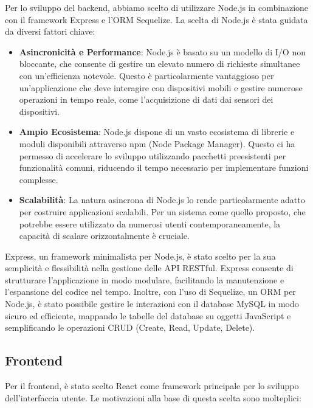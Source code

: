 \documentclass[twoside]{supsistudent}
\begin{document}
Per lo sviluppo del backend, abbiamo scelto di utilizzare Node.js in combinazione con il framework Express e l'ORM Sequelize. La scelta di Node.js è stata guidata da diversi fattori chiave:

\begin{itemize}
  \item \textbf{Asincronicità e Performance}: Node.js è basato su un modello di I/O non bloccante, che consente di gestire un elevato numero di richieste simultanee con un'efficienza notevole. Questo è particolarmente vantaggioso per un'applicazione che deve interagire con dispositivi mobili e gestire numerose operazioni in tempo reale, come l'acquisizione di dati dai sensori dei dispositivi.
  \item \textbf{Ampio Ecosistema}: Node.js dispone di un vasto ecosistema di librerie e moduli disponibili attraverso npm (Node Package Manager). Questo ci ha permesso di accelerare lo sviluppo utilizzando pacchetti preesistenti per funzionalità comuni, riducendo il tempo necessario per implementare funzioni complesse.
  \item \textbf{Scalabilità}: La natura asincrona di Node.js lo rende particolarmente adatto per costruire applicazioni scalabili. Per un sistema come quello proposto, che potrebbe essere utilizzato da numerosi utenti contemporaneamente, la capacità di scalare orizzontalmente è cruciale.
\end{itemize}

Express, un framework minimalista per Node.js, è stato scelto per la sua semplicità e flessibilità nella gestione delle API RESTful. Express consente di strutturare l'applicazione in modo modulare, facilitando la manutenzione e l'espansione del codice nel tempo. Inoltre, con l'uso di Sequelize, un ORM per Node.js, è stato possibile gestire le interazioni con il database MySQL in modo sicuro ed efficiente, mappando le tabelle del database su oggetti JavaScript e semplificando le operazioni CRUD (Create, Read, Update, Delete).

\subsection{Frontend}

Per il frontend, è stato scelto React come framework principale per lo sviluppo dell'interfaccia utente. Le motivazioni alla base di questa scelta sono molteplici:
\end{document}
